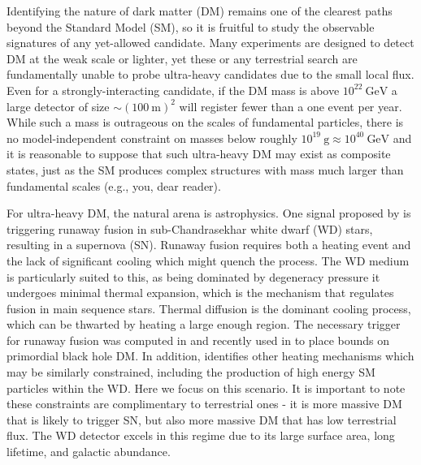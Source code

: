 \documentclass[twocolumn,preprintnumbers,amsmath,amssymb,prl, superscriptaddress]{revtex4}
\newcommand{\GeV}{\text{GeV}}
\begin{document}
Identifying the nature of dark matter (DM) remains one of the clearest paths beyond the Standard Model (SM), so it is fruitful to study the observable signatures of any yet-allowed candidate.
Many experiments are designed to detect DM at the weak scale or lighter, yet these or any terrestrial search are fundamentally unable to probe ultra-heavy candidates due to the small local flux.
Even for a strongly-interacting candidate, if the DM mass is above $10^{22} ~\GeV$ a large detector of size $\sim (100 ~\text{m})^2$ will register fewer than a one event per year.
While such a mass is outrageous on the scales of fundamental particles, there is no model-independent constraint on masses below roughly $10^{19} ~\text{g} \approx 10^{40} ~\GeV$ and it is reasonable to suppose that such ultra-heavy DM may exist as composite states, just as the SM produces complex structures with mass much larger than fundamental scales (e.g., you, dear reader).

For ultra-heavy DM, the natural arena is astrophysics.
One signal proposed by \cite{Graham:2015apa} is triggering runaway fusion in sub-Chandrasekhar white dwarf (WD) stars, resulting in a supernova (SN).
Runaway fusion requires both a heating event and the lack of significant cooling which might quench the process.
The WD medium is particularly suited to this, as being dominated by degeneracy pressure it undergoes minimal thermal expansion, which is the mechanism that regulates fusion in main sequence stars.
Thermal diffusion is the dominant cooling process, which can be thwarted by heating a large enough region.
The necessary trigger for runaway fusion was computed in \cite{Woosley} and recently used in \cite{Graham:2015apa} to place bounds on primordial black hole DM.
In addition, \cite{Graham:2015apa} identifies other heating mechanisms which may be similarly constrained, including the production of high energy SM particles within the WD.
Here we focus on this scenario.
It is important to note these constraints are complimentary to terrestrial ones - it is more massive DM that is likely to trigger SN, but also more massive DM that has low terrestrial flux.
The WD detector excels in this regime due to its large surface area, long lifetime, and galactic abundance.
\end{document}
